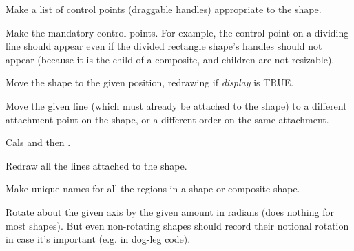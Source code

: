 

Make a list of control points (draggable handles) appropriate to the shape.



Make the mandatory control points. For example, the control point on a dividing line should
appear even if the divided rectangle shape's handles should not appear (because it is the child of
a composite, and children are not resizable).

\label{wxshapemove}


Move the shape to the given position, redrawing if {\it display} is TRUE.

\label{wxshapemovelinetonewattachment}


Move the given line (which must already be attached to the shape) to 
a different attachment point on the shape, or a different order on the same attachment.

Cals  and then .



Redraw all the lines attached to the shape.



Make unique names for all the regions in a shape or composite shape.



Rotate about the given axis by the given amount in radians (does nothing
for most shapes). But even non-rotating shapes should record their
notional rotation in case it's important (e.g. in dog-leg code).

